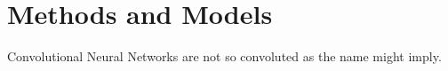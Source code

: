 \section{Methods and Models}
Convolutional Neural Networks are not so convoluted as the name might imply.